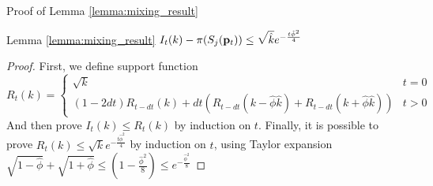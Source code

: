 \documentclass[../main.tex]{subfiles}
\begin{document}
	\begin{frame}{Proof of Lemma \ref{lemma:mixing_result}}
		\begin{block}{Lemma \ref{lemma:mixing_result}}
			$I_t(k) - \pi(S_j(\bold{p}_{t})) \leq \sqrt{\hat{k}} e^{-\frac{t\hat{\phi}^2}{4}}$
		\end{block}
		\begin{proof}
			First, we define support function $$R_t(k) = \begin{cases} \sqrt{k} & t=0 \\ (1-2dt)R_{t-dt}(k) + dt(R_{t-dt}(k-\hat{\phi}\hat{k}) + R_{t-dt}(k+\hat{\phi}\hat{k})) & t>0
			\end{cases}$$
			And then prove $I_t(k)\leq R_t(k)$ by induction on $t$. Finally, it is possible to prove $R_t(k) \leq \sqrt{k}e^{-\frac{t\hat{\phi}^2}{4}}$ by induction on $t$, using Taylor expansion $\sqrt{1-\hat{\phi}}+\sqrt{1+\hat{\phi}} \leq (1-\frac{\hat{\phi}^2}{8}) \leq e^{-\frac{\hat{\phi}^2}{8}}$
		\end{proof}
	\end{frame}
\end{document}
